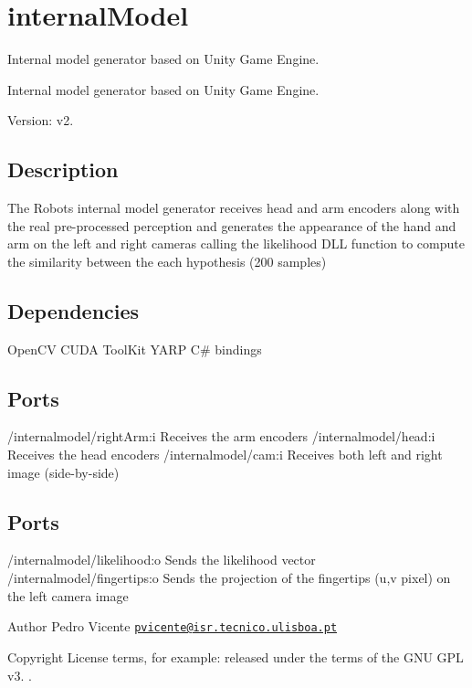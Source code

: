 \section{internal\+Model}
\label{group__internalModel}


Internal model generator based on Unity Game Engine.  


Internal model generator based on Unity Game Engine. 

Version\+: v2.\hypertarget{group__internalModel_Description}{}\subsection{Description}\label{group__internalModel_Description}
The Robot\textquotesingle{}s internal model generator receives head and arm encoders along with the real pre-\/processed perception and generates the appearance of the hand and arm on the left and right cameras calling the likelihood D\+LL function to compute the similarity between the each hypothesis (200 samples)\hypertarget{group__internalModel_Dependencies}{}\subsection{Dependencies}\label{group__internalModel_Dependencies}
Open\+CV C\+U\+DA Tool\+Kit Y\+A\+RP C\# bindings\hypertarget{group__internalModel_Input}{}\subsection{Ports}\label{group__internalModel_Input}
/internalmodel/right\+Arm\+:i Receives the arm encoders /internalmodel/head\+:i Receives the head encoders /internalmodel/cam\+:i Receives both left and right image (side-\/by-\/side)\hypertarget{group__internalModel_Output}{}\subsection{Ports}\label{group__internalModel_Output}
/internalmodel/likelihood\+:o Sends the likelihood vector /internalmodel/fingertips\+:o Sends the projection of the fingertips (u,v pixel) on the left camera image

\begin{DoxyAuthor}{Author}
Pedro Vicente \href{mailto:pvicente@isr.tecnico.ulisboa.pt}{\tt pvicente@isr.\+tecnico.\+ulisboa.\+pt} ~\newline

\end{DoxyAuthor}
\begin{DoxyCopyright}{Copyright}
License terms, for example\+: released under the terms of the G\+NU G\+PL v3. . 
\end{DoxyCopyright}
